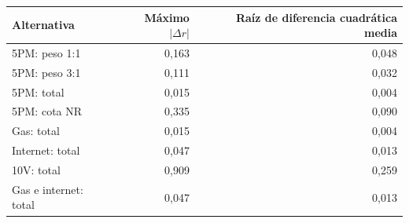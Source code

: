 \begin{tabular}{@{}lrr@{}}
\toprule
Alternativa & Máximo $|\Delta r|$ & Raíz de diferencia cuadrática media \\
\midrule
5PM: peso 1:1 & 0,163 & 0,048 \\
5PM: peso 3:1 & 0,111 & 0,032 \\
5PM: total & 0,015 & 0,004 \\
5PM: cota NR & 0,335 & 0,090 \\
Gas: total & 0,015 & 0,004 \\
Internet: total & 0,047 & 0,013 \\
10V: total & 0,909 & 0,259 \\
Gas e internet: total & 0,047 & 0,013 \\
\bottomrule
\end{tabular}

